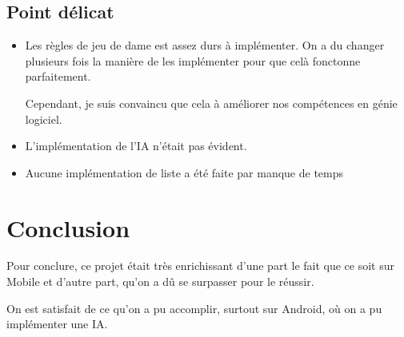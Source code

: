 \documentclass{article}
\begin{document}
\subsection{Point délicat}

\begin{itemize}
  \item Les règles de jeu de dame est assez durs à implémenter. On a du 
  changer plusieurs fois la manière de les implémenter pour que celà fonctonne parfaitement.

  Cependant, je suis convaincu que cela à améliorer nos compétences en génie logiciel.

  \item L'implémentation de l'IA n'était pas évident.
  
  \item Aucune implémentation de liste a été faite par manque de temps
  
\end{itemize}

\section{Conclusion}

 Pour conclure, ce projet était très enrichissant d'une part le 
 fait que ce soit sur Mobile et d'autre part, qu'on a dû se surpasser pour le réussir.

 On est satisfait de ce qu'on a pu accomplir, surtout sur Android, où on a pu implémenter une IA.



\end{document}
